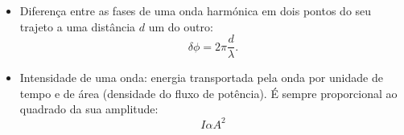 \begin{itemize}
\item Diferença entre as fases de uma onda harmónica em dois pontos do seu
trajeto a uma distância $d$ um do outro:
\begin{equation*}
\delta \phi = 2\pi\frac{d}{\lambda}.
\end{equation*}
\item Intensidade de uma onda: energia transportada pela onda por unidade de
    tempo e de área (densidade do fluxo de potência). É sempre proporcional ao
    quadrado da sua amplitude:
    \begin{equation*}
        I\alpha A^2
    \end{equation*}
\end{itemize}

